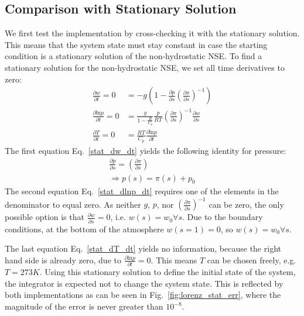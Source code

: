 \subsection{Comparison with Stationary Solution}
We first test the implementation by cross-checking it with the stationary solution.
This means that the system state must stay constant in case the starting condition is a stationary solution of the non-hydrostatic NSE.
To find a stationary solution for the non-hydrostatic NSE, we set all time derivatives to zero:
\begin{align}
\frac{\partial w}{\partial t} =0&= -g\left(1 - \frac{\partial p}{\partial s}\left(\frac{\partial \pi}{\partial s}\right)^{-1}\right)\label{stat_dw_dt} \\
\frac{\partial \text{ln}p}{\partial t}=0 &= \frac{g}{1- \frac{R}{C_p}} \frac{p}{RT}\left(\frac{\partial \pi}{\partial s}\right)^{-1} \frac{\partial w}{\partial s}\label{stat_dlnp_dt}\\
\frac{\partial T}{\partial t} =0&= \frac{RT}{C_p}\frac{\partial \text{ln}p}{\partial t}\label{stat_dT_dt}
\end{align}
The first equation Eq.~\ref{stat_dw_dt} yields the following identity for pressure:
\begin{align*}
\frac{\partial p}{\partial s}=\left(\frac{\partial \pi}{\partial s}\right)\\
\Rightarrow p(s)=\pi (s) + p_0
\end{align*}
The second equation Eq.~\ref{stat_dlnp_dt} requires one of the elements in the denominator to equal zero.
As neither $g$, $p$, nor $\left(\frac{\partial \pi}{\partial s}\right)^{-1}$ can be zero, the only possible option is that $\frac{\partial w}{\partial s}=0$, i.e. $w(s)=w_0 \forall s$.
Due to the boundary conditions, at the bottom of the atmosphere $w(s=1)=0$, so $w(s)=w_0 \forall s$.

The last equation Eq.~\ref{stat_dT_dt} yields no information, because the right hand side is already zero, due to $\frac{\partial \text{ln}p}{\partial t}=0$.
This means $T$ can be chosen freely, e.g. $T=273K$.
Using this stationary solution to define the initial state of the system, the integrator is expected not to change the system state.
This is reflected by both implementations as can be seen in Fig.~\ref{fig:lorenz_stat_err}, where the magnitude of the error is never greater than $10^{-8}$.

